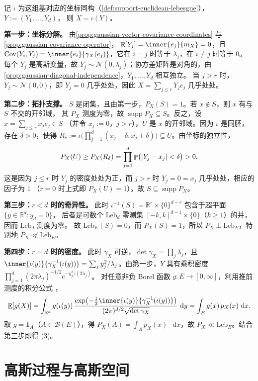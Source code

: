 \documentclass[UTF8,11pt,a4paper,oneside,fontset=fandol]{ctexrep}
\makeatletter
\numberwithin{equation}{section}
\theoremstyle{zhthm}
\renewenvironment{proof}[1][\proofname]{\par
  \pushQED{\qed}%
  \normalfont\topsep6\p@\@plus6\p@\relax
  \trivlist
  \item[\hskip\labelsep\bfseries#1\hspace{0.5em}]\ignorespaces
}{%
  \popQED\endtrivlist\@endpefalse
}
\renewcommand{\proofname}{证明}
\newcommand{\R}{\mathbb{R}}
\newcommand{\B}{\mathcal{B}}
\DeclareMathOperator{\Prob}{\mathbb{P}}
\DeclareMathOperator{\E}{\mathbb{E}}
\DeclareMathOperator{\Cov}{Cov}
\DeclareMathOperator{\supp}{supp}
\newcommand{\Leb}{\mathrm{Leb}}
\newcommand{\Normal}{\mathcal{N}}
\newcommand{\ind}[1]{\mathbf{1}_{#1}}
\newcommand{\dd}{\mathop{}\!\mathrm{d}}
\DeclarePairedDelimiter{\abs}{\lvert}{\rvert}
\makeatother
\begin{document}
\begin{proof}
记 $\iota$ 为这组基对应的坐标同构（\cref{def:support-euclidean-lebesgue}），$Y:=(Y_1,\ldots,Y_d)$，
则 $X=\iota(Y)$。

\textbf{第一步：坐标分解。}
由\cref{prop:gaussian-vector-covariance-coordinates} 与\cref{prop:gaussian-covariance-operator}，
$\E[Y_j]=\inner{e_j}{m_X}=0$，且 $\Cov(Y_i,Y_j)=\inner{e_i}{\gamma_X(e_j)}$，它在 $i=j$ 时等于 $\lambda_j$，在 $i\ne j$ 时等于 $0$。
每个 $Y_j$ 是高斯变量，故 $Y_j\sim\Normal(0,\lambda_j)$；协方差矩阵是对角的，由%
\cref{prop:gaussian-diagonal-independence}，$Y_1,\ldots,Y_d$ 相互独立。
当 $j>r$ 时，$Y_j\sim\Normal(0,0)$，即 $Y_j=0$ 几乎处处，因此 $X=\sum_{j\le r}Y_je_j$ 几乎处处。

\textbf{第二步：拓扑支撑。}
$S$ 是闭集，且由第一步，$P_X(S)=1$。若 $x\notin S$，则 $x$ 有与 $S$ 不交的开邻域，
其 $P_X$ 测度为零，故 $\supp P_X\subseteq S$。反之，设 $x=\sum_{j\le r}x_je_j\in S$
（并令 $x_j:=0$，$j>r$），$U$ 是 $x$ 的开邻域。因为 $\iota$ 是同胚，存在 $\delta>0$，使得
$R_\delta:=\iota\bigl(\prod_{j=1}^{d}(x_j-\delta,x_j+\delta)\bigr)\subseteq U$。由坐标的独立性，
\[
  P_X(U)\ge P_X(R_\delta)=\prod_{j=1}^{d}\Prob\bigl(\abs{Y_j-x_j}<\delta\bigr)>0,
\]
这是因为 $j\le r$ 时 $Y_j$ 的密度处处为正，而 $j>r$ 时 $Y_j=0=x_j$ 几乎处处，相应的因子为 $1$
（$r=0$ 时上式即 $P_X(U)=1$）。故 $S\subseteq\supp P_X$。

\textbf{\boldmath 第三步：$r<d$ 时的奇异性。}
此时 $\iota^{-1}(S)=\R^r\times\{0\}^{d-r}$ 包含于超平面 $\{y\in\R^d:y_d=0\}$，
后者是可数个 $\Leb_d$ 零测集 $[-k,k]^{d-1}\times\{0\}$（$k\ge1$）的并，因而 $\Leb_d$ 测度为零。
故 $\Leb_E(S)=0$，而 $P_X(S)=1$，所以 $P_X\perp\Leb_E$，特别地 $P_X\not\ll\Leb_E$。

\textbf{\boldmath 第四步：$r=d$ 时的密度。}
此时 $\gamma_X$ 可逆，$\det\gamma_X=\prod_{j}\lambda_j$，且
$\inner{\iota(y)}{\gamma_X^{-1}(\iota(y))}=\sum_jy_j^2/\lambda_j$。由第一步，$Y$ 具有乘积密度
$\prod_{j=1}^{d}(2\pi\lambda_j)^{-1/2}e^{-y_j^2/(2\lambda_j)}$。
对任意非负 Borel 函数 $g:E\to[0,\infty]$，利用推前测度的积分公式%
\cite[练习 1.4.38(ii)，第 103 页]{Tao2011}，
\[
  \E[g(X)]=\int_{\R^d}g(\iota(y))\,
    \frac{\exp\bigl(-\frac12\inner{\iota(y)}{\gamma_X^{-1}(\iota(y))}\bigr)}{(2\pi)^{d/2}\sqrt{\det\gamma_X}}\,\dd y
  =\int_Eg(x)\,p_X(x)\,\dd x.
\]
取 $g=\ind{A}$（$A\in\B(E)$），得 $P_X(A)=\int_Ap_X(x)\,\dd x$，故 $P_X\ll\Leb_E$。结合第三步即得 (3)。
\end{proof}

\section{高斯过程与高斯空间}
\label{sec:gaussian-processes-spaces}
\end{document}
